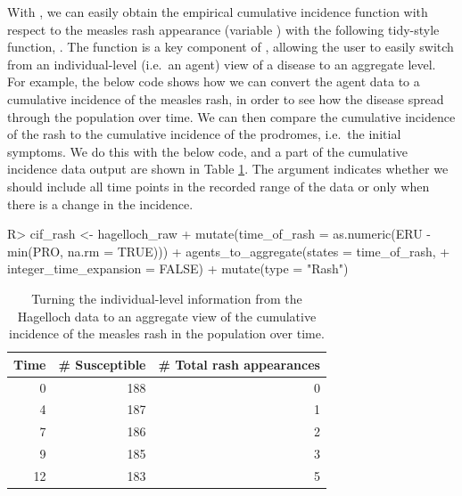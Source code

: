 \documentclass[
  shortnames]{jss}
\begin{document}
With , we can easily obtain the empirical cumulative
incidence function with respect to the measles rash appearance (variable
) with the following tidy-style function,
. The function  is a
key component of , allowing the user to easily switch
from an individual-level (i.e.~an agent) view of a disease to an
aggregate level. For example, the below code shows how we can convert
the agent data to a cumulative incidence of the measles rash, in order
to see how the disease spread through the population over time. We can
then compare the cumulative incidence of the rash to the cumulative
incidence of the prodromes, i.e.~the initial symptoms. We do this with
the below code, and a part of the cumulative incidence data output are
shown in Table \ref{tab:cif-rash}. The argument
 indicates whether we should include all
time points in the recorded range of the data or only when there is a
change in the incidence.

\begin{CodeChunk}
\begin{CodeInput}
R> cif_rash  <- hagelloch_raw %
+   mutate(time_of_rash = as.numeric(ERU - min(PRO, na.rm = TRUE))) %
+   agents_to_aggregate(states = time_of_rash,
+                       integer_time_expansion = FALSE) %
+   mutate(type = "Rash")
\end{CodeInput}
\end{CodeChunk}

\begin{CodeChunk}
\begin{table}[!h]

\caption{\label{tab:cif-rash}Turning the individual-level information from the Hagelloch data to an aggregate view of the cumulative incidence of the measles rash in the population over time.}
\centering
\begin{tabular}[t]{rrr}
\toprule
Time & \# Susceptible & \# Total rash appearances\\
\midrule
0 & 188 & 0\\
4 & 187 & 1\\
7 & 186 & 2\\
9 & 185 & 3\\
12 & 183 & 5\\
\bottomrule
\end{tabular}
\end{table}

\end{CodeChunk}
\end{document}
